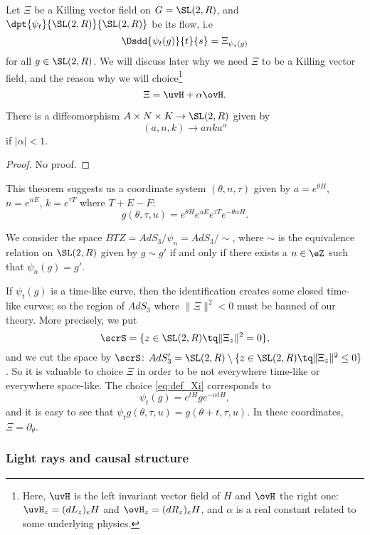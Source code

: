 Let $\Xi$ be a Killing vector field on $G=\SL(2,R)$, and $\dpt{\psi_t}{\SL(2,R)}{\SL(2,R)}$ be its flow, i.e
\[
	\Dsdd{\psi_t(g)}{t}{s}=\Xi_{\psi_s(g)}
\]
for all $g\in\SL(2,R)$. We will discuss later why we need $\Xi$ to be a Killing vector field, and the reason why we will choice\footnote{Here, $\uvH$ is the left invariant vector field of $H$ and $\ovH$ the right one: $\uvH_z=(dL_z)_eH$ and $\ovH_z=(dR_z)_eH$, and $\alpha$ is a real constant related to some underlying physics.}
\begin{equation}\label{eq:def_Xi}
	\Xi=\uvH+\alpha\ovH.
\end{equation}

\begin{theorem}
	There is a diffeomorphism $A\times N\times K\to \SL(2,R)$ given by
	\[
		(a,n,k)\to anka^{\alpha}
	\]
	if $|\alpha|< 1$.
\end{theorem}
\begin{proof}
	No proof.
\end{proof}

This theorem suggests us a coordinate system $(\theta,n,\tau)$ given by $a=e^{\theta H}$, $n=e^{n E}$, $k=e^{\tau T}$ where $T+E-F$:
\[
	g(\theta,\tau,u)=e^{\theta H}e^{uE}e^{\tau T}e^{-\theta\alpha H}.
\]

We consider the space $BTZ=AdS_3/\psi_n=AdS_3/\sim$, where $\sim$ is the equivalence relation on $\SL(2,R)$ given by $g\sim g'$ if and only if there exists a $n\in\eZ$ such that $\psi_n(g)=g'$.

If $\psi_t(g)$ is a time-like curve, then the identification creates some closed time-like curves; so the region of $AdS_3$ where $\|\Xi\|^2<0$ must be banned of our theory. More precisely, we put
\[
	\scrS=\{z\in\SL(2,R)\tq \|\Xi_z\|^2=0\},
\]
and we cut the space by $\scrS$: $AdS_3'=\SL(2,R)\setminus \{z\in\SL(2,R)\tq \|\Xi_z\|^2\leq 0\}$. So it is valuable to choice $\Xi$ in order to be not everywhere time-like or everywhere space-like. The choice \eqref{eq:def_Xi} corresponds to
\begin{equation}
	\psi_t(g)=e^{tH}ge^{-\alpha tH},
\end{equation}
and it is easy to see that $\psi_tg(\theta,\tau,u)=g(\theta+t,\tau,u)$. In these coordinates, $\Xi=\partial_{\theta}$.

\subsubsection{Light rays and causal structure}

